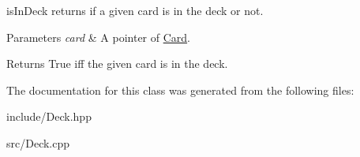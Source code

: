 is\-In\-Deck returns if a given card is in the deck or not. 


\begin{DoxyParams}{\-Parameters}
{\em card} & \-A pointer of \hyperlink{classCard}{\-Card}. \\
\hline
\end{DoxyParams}
\begin{DoxyReturn}{\-Returns}
\-True iff the given card is in the deck. 
\end{DoxyReturn}


\-The documentation for this class was generated from the following files\-:\begin{DoxyCompactItemize}
\item 
include/\-Deck.\-hpp\item 
src/\-Deck.\-cpp\end{DoxyCompactItemize}
